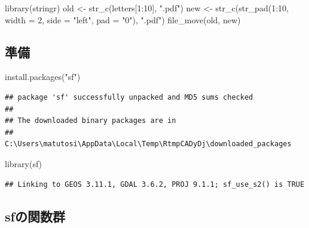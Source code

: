 \documentclass[
]{article}
\newenvironment{Shaded}{\begin{snugshade}}{\end{snugshade}}
\newcommand{\AttributeTok}[1]{\textcolor[rgb]{0.77,0.63,0.00}{#1}}
\newcommand{\DecValTok}[1]{\textcolor[rgb]{0.00,0.00,0.81}{#1}}
\newcommand{\FunctionTok}[1]{\textcolor[rgb]{0.00,0.00,0.00}{#1}}
\newcommand{\NormalTok}[1]{#1}
\newcommand{\OtherTok}[1]{\textcolor[rgb]{0.56,0.35,0.01}{#1}}
\newcommand{\SpecialCharTok}[1]{\textcolor[rgb]{0.00,0.00,0.00}{#1}}
\newcommand{\StringTok}[1]{\textcolor[rgb]{0.31,0.60,0.02}{#1}}
\begin{document}
\begin{Shaded}
\begin{Highlighting}[]
\FunctionTok{library}\NormalTok{(stringr)}
\NormalTok{old }\OtherTok{\textless{}{-}} \FunctionTok{str\_c}\NormalTok{(letters[}\DecValTok{1}\SpecialCharTok{:}\DecValTok{10}\NormalTok{], }\StringTok{".pdf"}\NormalTok{)}
\NormalTok{new }\OtherTok{\textless{}{-}} \FunctionTok{str\_c}\NormalTok{(}\FunctionTok{str\_pad}\NormalTok{(}\DecValTok{1}\SpecialCharTok{:}\DecValTok{10}\NormalTok{, }\AttributeTok{width =} \DecValTok{2}\NormalTok{, }\AttributeTok{side =} \StringTok{"left"}\NormalTok{, }\AttributeTok{pad =} \StringTok{"0"}\NormalTok{), }\StringTok{".pdf"}\NormalTok{)}
\FunctionTok{file\_move}\NormalTok{(old, new)}
\end{Highlighting}
\end{Shaded}

\hypertarget{ux6e96ux5099}{%
\subsection{準備}\label{ux6e96ux5099}}

\begin{Shaded}
\begin{Highlighting}[]
\FunctionTok{install.packages}\NormalTok{(}\StringTok{"sf"}\NormalTok{)}
\end{Highlighting}
\end{Shaded}

\begin{verbatim}
## package 'sf' successfully unpacked and MD5 sums checked
## 
## The downloaded binary packages are in
##  C:\Users\matutosi\AppData\Local\Temp\RtmpCADyDj\downloaded_packages
\end{verbatim}

\begin{Shaded}
\begin{Highlighting}[]
\FunctionTok{library}\NormalTok{(sf)}
\end{Highlighting}
\end{Shaded}

\begin{verbatim}
## Linking to GEOS 3.11.1, GDAL 3.6.2, PROJ 9.1.1; sf_use_s2() is TRUE
\end{verbatim}

\hypertarget{sfux306eux95a2ux6570ux7fa4}{%
\subsection{sfの関数群}\label{sfux306eux95a2ux6570ux7fa4}}
\end{document}
